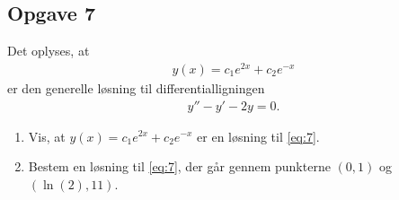 \subsection*{Opgave 7}
	Det oplyses, at 
	\begin{align*}
		y(x) = c_1e^{2x}+c_2e^{-x}
	\end{align*}
	er den generelle løsning til differentialligningen
	\begin{align}\label{eq:7}
		y''-y'-2y=0.
	\end{align}
\begin{enumerate}[label=\roman*)]
\item Vis, at $y(x) = c_1e^{2x}+c_2e^{-x}$ er en løsning til \eqref{eq:7}.
\item Bestem en løsning til \eqref{eq:7}, der går gennem punkterne $(0,1)$ og $(\ln(2), 11)$.
\end{enumerate}
